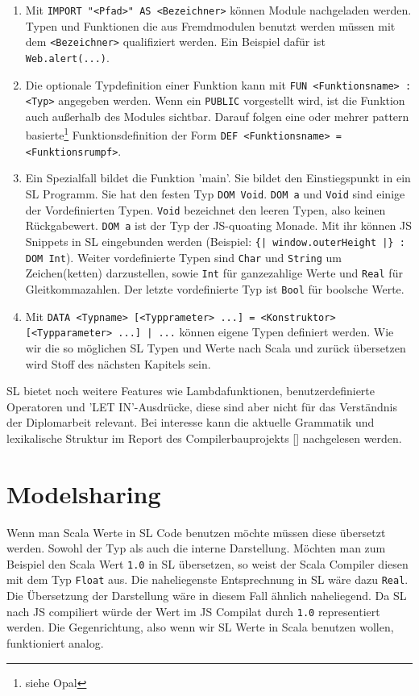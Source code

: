 \documentclass[12pt]{scrreprt}
\begin{document}
\begin{enumerate}
  \item Mit \lstinline!IMPORT "<Pfad>" AS <Bezeichner>! können Module nachgeladen werden. Typen und Funktionen die aus Fremdmodulen benutzt werden müssen mit dem \lstinline!<Bezeichner>! qualifiziert werden. Ein Beispiel dafür ist \lstinline!Web.alert(...)!.
  \item Die optionale Typdefinition einer Funktion kann mit \lstinline!FUN <Funktionsname> : <Typ>! angegeben werden. Wenn ein \lstinline!PUBLIC! vorgestellt wird, ist die Funktion auch außerhalb des Modules sichtbar. Darauf folgen eine oder mehrer pattern basierte\footnote{siehe Opal} Funktionsdefinition der Form \lstinline!DEF <Funktionsname> = <Funktionsrumpf>!.
  \item Ein Spezialfall bildet die Funktion 'main'. Sie bildet den Einstiegspunkt in ein \ac{SL} Programm. Sie hat den festen Typ \lstinline!DOM Void!. \lstinline!DOM a! und \lstinline!Void! sind einige der Vordefinierten Typen. \lstinline!Void! bezeichnet den leeren Typen, also keinen Rückgabewert. \lstinline!DOM a! ist der Typ der \ac{JS}-quoating Monade. Mit ihr können \ac{JS} Snippets in \ac{SL} eingebunden werden (Beispiel: \lstinline!{| window.outerHeight |} : DOM Int!). Weiter vordefinierte Typen sind \lstinline!Char! und \lstinline!String! um Zeichen(ketten) darzustellen, sowie \lstinline!Int! für ganzezahlige Werte und \lstinline!Real! für Gleitkommazahlen. Der letzte vordefinierte Typ ist \lstinline!Bool! für boolsche Werte.
  \item Mit \lstinline!DATA <Typname> [<Typprameter> ...] = <Konstruktor> [<Typparameter> ...] | ...! können eigene Typen definiert werden. Wie wir die so möglichen \ac{SL} Typen und Werte nach Scala und zurück übersetzen wird Stoff des nächsten Kapitels sein.
\end{enumerate}

\ac{SL} bietet noch weitere Features wie Lambdafunktionen, benutzerdefinierte Operatoren und 'LET IN'-Ausdrücke, diese sind aber nicht für das Verständnis der Diplomarbeit relevant. Bei interesse kann die aktuelle Grammatik und lexikalische Struktur im Report des Compilerbauprojekts [] nachgelesen werden.

\chapter{Modelsharing}

Wenn man Scala Werte in \ac{SL} Code benutzen möchte müssen diese übersetzt werden. Sowohl der Typ als auch die interne Darstellung. Möchten man zum Beispiel den Scala Wert \lstinline!1.0! in \ac{SL} übersetzen, so weist der Scala Compiler diesen mit dem Typ \lstinline!Float! aus. Die naheliegenste Entsprechnung in \ac{SL} wäre dazu \lstinline!Real!. Die Übersetzung der Darstellung wäre in diesem Fall ähnlich naheliegend. Da \ac{SL} nach \ac{JS} compiliert würde der Wert im \ac{JS} Compilat durch \lstinline!1.0! representiert werden. Die Gegenrichtung, also wenn wir \ac{SL} Werte in Scala benutzen wollen, funktioniert analog. 
\end{document}
